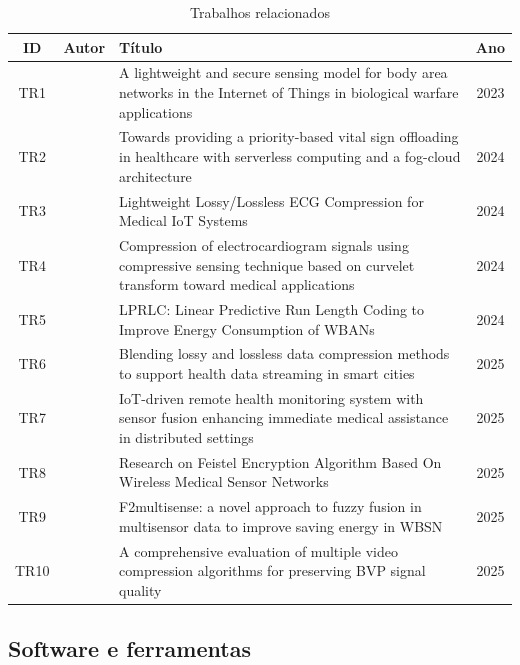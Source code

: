 \documentclass[twoside,english,brazilian]{UNISINOSmonografia}
\begin{document}
\begin{table}[h!]
\centering
\caption{Trabalhos relacionados}
\label{tab:trabalhos-relacionados}
\begin{tabular}{|c|p{3.5cm}|p{8.5cm}|c|}
\hline
\textbf{ID} & \textbf{Autor} & \textbf{Título} & \textbf{Ano} \\ \hline
TR1 & \cite{ESMAEILI2023} & A lightweight and secure sensing model for body area networks in the Internet of Things in biological warfare applications & 2023 \\ \hline
TR2 & \cite{CASSEL2024} & Towards providing a priority-based vital sign offloading in healthcare with serverless computing and a fog-cloud architecture & 2024 \\ \hline
TR3 & \cite{Chang2024} & Lightweight Lossy/Lossless ECG Compression for Medical IoT Systems & 2024 \\ \hline
TR4 & \cite{Hassan2024} & Compression of electrocardiogram signals using compressive sensing technique based on curvelet transform toward medical applications & 2024 \\ \hline
TR5 & \cite{Vakil2024} & LPRLC: Linear Predictive Run Length Coding to Improve Energy Consumption of WBANs & 2024 \\ \hline
TR6 & \cite{Andrade2025} & Blending lossy and lossless data compression methods to support health data streaming in smart cities & 2025 \\ \hline
TR7 & \cite{MOHAPATRA2025} & IoT-driven remote health monitoring system with sensor fusion enhancing immediate medical assistance in distributed settings & 2025 \\ \hline
TR8 & \cite{TAO2025} & Research on Feistel Encryption Algorithm Based On Wireless Medical Sensor Networks & 2025 \\ \hline
TR9 & \cite{Shankani2025} & F2multisense: a novel approach to fuzzy fusion in multisensor data to improve saving energy in WBSN & 2025 \\ \hline
TR10 & \cite{Zhou2025} & A comprehensive evaluation of multiple video compression algorithms for preserving BVP signal quality & 2025 \\ \hline
\end{tabular}
\end{table}

\subsection{Software e ferramentas}
\end{document}
